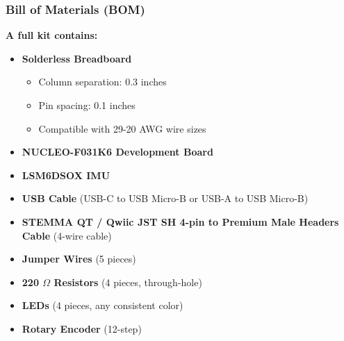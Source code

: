 \documentclass{beamer}
\begin{document}
\begin{frame}
    \frametitle{Bill of Materials (BOM)}
    \textbf{A full kit contains:}
    \begin{itemize}
        \item \textbf{Solderless Breadboard}
        \begin{itemize}
            \item Column separation: 0.3 inches
            \item Pin spacing: 0.1 inches
            \item Compatible with 29-20 AWG wire sizes
        \end{itemize}
        \item \textbf{NUCLEO-F031K6 Development Board}
        \item \textbf{LSM6DSOX IMU}
        \item \textbf{USB Cable} (USB-C to USB Micro-B or USB-A to USB Micro-B)
        \item \textbf{STEMMA QT / Qwiic JST SH 4-pin to Premium Male Headers Cable} (4-wire cable)
        \item \textbf{Jumper Wires} (5 pieces)
        \item \textbf{220 $\Omega$ Resistors} (4 pieces, through-hole)
        \item \textbf{LEDs} (4 pieces, any consistent color)
        \item \textbf{Rotary Encoder} (12-step)
    \end{itemize}
\end{frame}
\end{document}
